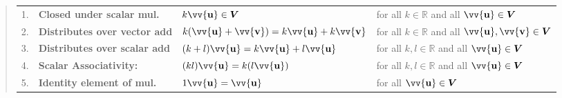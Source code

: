 \documentclass[11pt]{article}
\DeclareRobustCommand{\myvec}[1]{\vv{\mathbf{#1}}}
\begin{document}
{\begin{quote}
            \begin{tabular}{ l >{\bfseries}l l l @{}}
                \hline
                1. & Closed under scalar mul.       & $k\myvec{u} \in \myV$                                & \makecell[l]{for all $k \in \mathbb{R}$\\ and all $\myvec{u} \in \myV$} \\
                2. & Distributes over vector add    & $k(\myvec{u}+\myvec{v}) = k\myvec{u} + k\myvec{v}$    & \makecell[l]{for all $k \in \mathbb{R}$\\ and all $\myvec{u}, \myvec{v} \in \myV$} \\
                3. & Distributes over scalar add    & $(k + l)\myvec{u} = k\myvec{u} + l\myvec{u}$          & \makecell[l]{for all $k, l \in \mathbb{R}$\\ and all $\myvec{u} \in \myV$} \\
                4. & Scalar Associativity:          & $(kl)\myvec{u} = k(l\myvec{u})$                       & \makecell[l]{for all $k, l \in \mathbb{R}$\\ and all $\myvec{u} \in \myV$} \\
                5. & Identity element of mul.       & $1\myvec{u} = \myvec{u}$                              & for all $\myvec{u} \in \myV$ \\
                \hline
            \end{tabular}
        \end{quote}
    }
\end{document}
